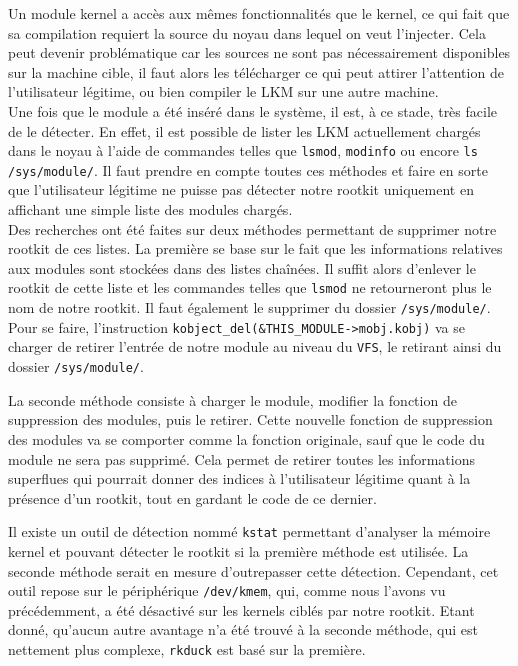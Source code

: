 \documentclass[12pt]{article}
\begin{document}
        Un module kernel a accès aux mêmes fonctionnalités que le kernel, ce qui fait que sa compilation requiert la source du noyau dans lequel on veut l'injecter. Cela peut devenir problématique car les sources ne sont pas nécessairement disponibles sur la machine cible, il faut alors les télécharger ce qui peut attirer l'attention de l'utilisateur légitime, ou bien compiler le LKM sur une autre machine. \\
        
        Une fois que le module a été inséré dans le système, il est, à ce stade, très facile de le détecter. En effet, il est possible de lister les LKM actuellement chargés dans le noyau à l'aide de commandes telles que \texttt{lsmod}, \texttt{modinfo} ou encore \texttt{ls /sys/module/}. Il faut prendre en compte toutes ces méthodes et faire en sorte que l'utilisateur légitime ne puisse pas détecter notre rootkit uniquement en affichant une simple liste des modules chargés. \\

        Des recherches ont été faites sur deux méthodes permettant de supprimer notre rootkit de ces listes. La première se base sur le fait que les informations relatives aux modules sont stockées dans des listes chaînées. Il suffit alors d'enlever le rootkit de cette liste et les commandes telles que \texttt{lsmod} ne retourneront plus le nom de notre rootkit. Il faut également le supprimer du dossier \texttt{/sys/module/}. Pour se faire, l'instruction \texttt{kobject\_del(\&THIS\_MODULE->mobj.kobj)} va se charger de retirer l'entrée de notre module au niveau du \texttt{VFS}, le retirant ainsi du dossier \texttt{/sys/module/}.
        
        La seconde méthode consiste à charger le module, modifier la fonction de suppression des modules, puis le retirer\cite{spacelkm}. Cette nouvelle fonction de suppression des modules va se comporter comme la fonction originale, sauf que le code du module ne sera pas supprimé. Cela permet de retirer toutes les informations superflues qui pourrait donner des indices à l'utilisateur légitime quant à la présence d'un rootkit, tout en gardant le code de ce dernier. 
		
		Il existe un outil de détection nommé \texttt{kstat} permettant d'analyser la mémoire kernel et pouvant détecter le rootkit si la première méthode est utilisée. La seconde méthode serait en mesure d'outrepasser cette détection. Cependant, cet outil repose sur le périphérique \texttt{/dev/kmem}, qui, comme nous l'avons vu précédemment, a été désactivé sur les kernels ciblés par notre rootkit. Etant donné, qu'aucun autre avantage n'a été trouvé à la seconde méthode, qui est nettement plus complexe, \texttt{rkduck} est basé sur la première. \\
        
\end{document}
